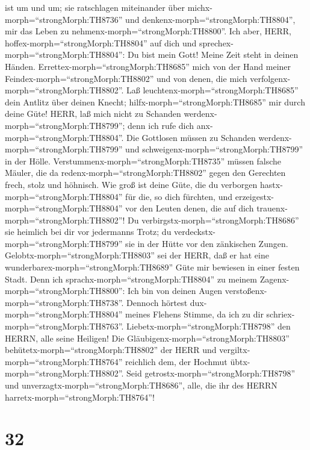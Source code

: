 ist um und um; sie ratschlagen miteinander über
michx-morph=``strongMorph:TH8736'' und
denkenx-morph=``strongMorph:TH8804'', mir das Leben zu
nehmenx-morph=``strongMorph:TH8800''.  Ich aber, HERR,
hoffex-morph=``strongMorph:TH8804'' auf dich und
sprechex-morph=``strongMorph:TH8804'': Du bist mein Gott! 
Meine Zeit steht in deinen Händen. Errettex-morph=``strongMorph:TH8685''
mich von der Hand meiner Feindex-morph=``strongMorph:TH8802'' und von
denen, die mich verfolgenx-morph=``strongMorph:TH8802''. 
Laß leuchtenx-morph=``strongMorph:TH8685'' dein Antlitz über deinen
Knecht; hilfx-morph=``strongMorph:TH8685'' mir durch deine Güte!
 HERR, laß mich nicht zu Schanden
werdenx-morph=``strongMorph:TH8799''; denn ich rufe dich
anx-morph=``strongMorph:TH8804''. Die Gottlosen müssen zu Schanden
werdenx-morph=``strongMorph:TH8799'' und
schweigenx-morph=``strongMorph:TH8799'' in der Hölle. 
Verstummenx-morph=``strongMorph:TH8735'' müssen falsche Mäuler, die da
redenx-morph=``strongMorph:TH8802'' gegen den Gerechten frech, stolz und
höhnisch.  Wie groß ist deine Güte, die du verborgen
hastx-morph=``strongMorph:TH8804'' für die, so dich fürchten, und
erzeigestx-morph=``strongMorph:TH8804'' vor den Leuten denen, die auf
dich trauenx-morph=``strongMorph:TH8802''!  Du
verbirgstx-morph=``strongMorph:TH8686'' sie heimlich bei dir vor
jedermanns Trotz; du verdeckstx-morph=``strongMorph:TH8799'' sie in der
Hütte vor den zänkischen Zungen. 
Gelobtx-morph=``strongMorph:TH8803'' sei der HERR, daß er hat eine
wunderbarex-morph=``strongMorph:TH8689'' Güte mir bewiesen in einer
festen Stadt.  Denn ich
sprachx-morph=``strongMorph:TH8804'' zu meinem
Zagenx-morph=``strongMorph:TH8800'': Ich bin von deinen Augen
verstoßenx-morph=``strongMorph:TH8738''. Dennoch hörtest
dux-morph=``strongMorph:TH8804'' meines Flehens Stimme, da ich zu dir
schriex-morph=``strongMorph:TH8763''. 
Liebetx-morph=``strongMorph:TH8798'' den HERRN, alle seine Heiligen! Die
Gläubigenx-morph=``strongMorph:TH8803''
behütetx-morph=``strongMorph:TH8802'' der HERR und
vergiltx-morph=``strongMorph:TH8764'' reichlich dem, der Hochmut
übtx-morph=``strongMorph:TH8802''.  Seid
getrostx-morph=``strongMorph:TH8798'' und
unverzagtx-morph=``strongMorph:TH8686'', alle, die ihr des HERRN
harretx-morph=``strongMorph:TH8764''!

\hypertarget{section-31}{%
\section{32}\label{section-31}}


